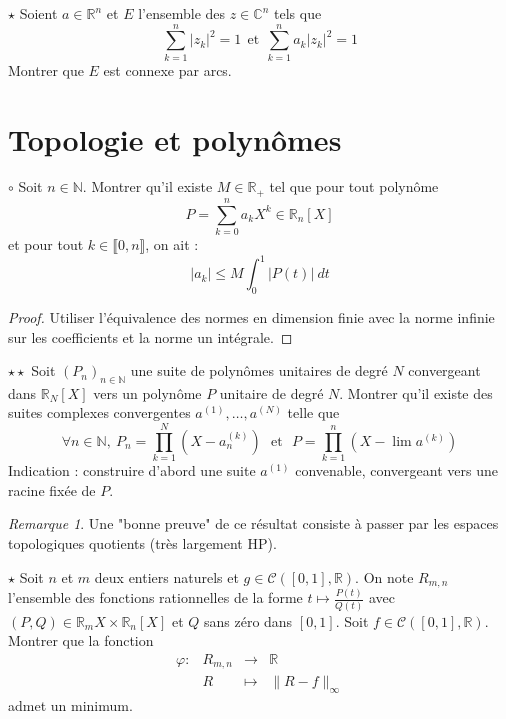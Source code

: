 \documentclass[french,a4paper]{article}
\newcommand{\N}{\mathbb{N}}
\newcommand{\R}{\mathbb{R}}
\newcommand{\C}{\mathbb{C}}
\theoremstyle{plain}
\theoremstyle{definition}
\theoremstyle{remark}
\newtheorem*{rmq}{Remarque}
\begin{document}
\begin{ex}[Moulin.44]{$\star$}
	Soient $a\in\R^n$ et $E$ l'ensemble des $z\in\C^n$ tels que $$\sum_{k=1}^{n}\lvert z_k\rvert^2=1\ \ \text{et}\ \ \sum_{k=1}^{n}a_k\lvert z_k\rvert^2=1$$ Montrer que $E$ est connexe par arcs.
\end{ex}

\section{Topologie et polynômes}

\begin{ex}[Moulin.45]{$\circ$}
	Soit $n\in\N$. Montrer qu'il existe $M\in\R_+$ tel que pour tout polynôme $$P=\sum_{k=0}^{n}a_kX^k\in\R_n[X]$$ et pour tout $k\in\llbracket0,n\rrbracket$, on ait : $$\lvert a_k\rvert\leqslant M\int_{0}^{1}\lvert P(t)\rvert\ dt$$
\end{ex}
\begin{proof}
	Utiliser l'équivalence des normes en dimension finie avec la norme infinie sur les coefficients et la norme un intégrale.
\end{proof}

\begin{ex}[Moulin.46]{$\star\star$}
	Soit $(P_n)_{n\in\N}$ une suite de polynômes unitaires de degré $N$ convergeant dans $\R_N[X]$ vers un polynôme $P$ unitaire de degré $N$. Montrer qu'il existe des suites complexes convergentes $a^{(1)},\ldots,a^{(N)}$ telle que $$\forall n\in\N,\ P_n=\prod_{k=1}^{N}(X-a_n^{(k)}) \ \ \ \text{et} \ \ \ P=\prod_{k=1}^{n}(X-\lim a^{(k)})$$ Indication : construire d'abord une suite $a^{(1)}$ convenable, convergeant vers une racine fixée de $P$.
\end{ex}
\begin{rmq}
	Une "bonne preuve" de ce résultat consiste à passer par les espaces topologiques quotients (très largement HP).
\end{rmq}

\begin{ex}[Moulin.47]{$\star$}
	Soit $n$ et $m$ deux entiers naturels et $g\in\mathcal{C}([0,1],\R)$. On note $R_{m,n}$ l'ensemble des fonctions rationnelles de la forme $\displaystyle t\mapsto \frac{P(t)}{Q(t)}$ avec $(P,Q)\in\R_m{X}\times\R_n[X]$ et $Q$ sans zéro dans $[0,1]$. Soit $f\in\mathcal{C}([0,1],\R)$. Montrer que la fonction $$\begin{array}{lrcl}
		\varphi:&R_{m,n}&\longrightarrow&\R \\
		&R&\longmapsto&\lVert R-f\rVert_\infty
	\end{array}$$ admet un minimum.
\end{ex}
\end{document}
